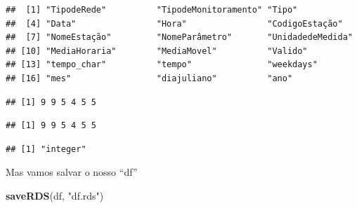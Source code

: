 \documentclass[]{book}
\newenvironment{Shaded}{\begin{snugshade}}{\end{snugshade}}
\newcommand{\KeywordTok}[1]{\textcolor[rgb]{0.13,0.29,0.53}{\textbf{#1}}}
\newcommand{\DecValTok}[1]{\textcolor[rgb]{0.00,0.00,0.81}{#1}}
\newcommand{\StringTok}[1]{\textcolor[rgb]{0.31,0.60,0.02}{#1}}
\newcommand{\OperatorTok}[1]{\textcolor[rgb]{0.81,0.36,0.00}{\textbf{#1}}}
\newcommand{\NormalTok}[1]{#1}
\begin{document}
\begin{verbatim}
##  [1] "TipodeRede"          "TipodeMonitoramento" "Tipo"               
##  [4] "Data"                "Hora"                "CodigoEstação"      
##  [7] "NomeEstação"         "NomeParâmetro"       "UnidadedeMedida"    
## [10] "MediaHoraria"        "MediaMovel"          "Valido"             
## [13] "tempo_char"          "tempo"               "weekdays"           
## [16] "mes"                 "diajuliano"          "ano"
\end{verbatim}

\begin{Shaded}
\end{Shaded}

\begin{verbatim}
## [1] 9 9 5 4 5 5
\end{verbatim}

\begin{Shaded}
\end{Shaded}

\begin{verbatim}
## [1] 9 9 5 4 5 5
\end{verbatim}

\begin{Shaded}
\end{Shaded}

\begin{verbatim}
## [1] "integer"
\end{verbatim}

Mas vamos salvar o nosso ``df''

\begin{Shaded}
\begin{Highlighting}[]
\KeywordTok{saveRDS}\NormalTok{(df, }\StringTok{"df.rds"}\NormalTok{)}
\end{Highlighting}
\end{Shaded}
\end{document}
